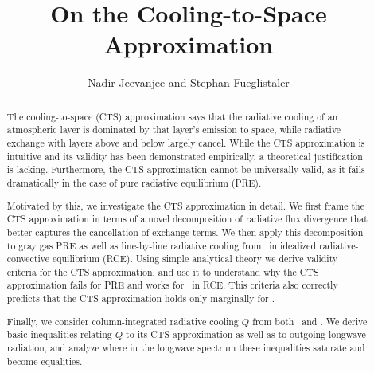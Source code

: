\documentclass[10pt]{article}
\begin{document}
%
%


\title{On the Cooling-to-Space Approximation}

%
%


 \author{Nadir Jeevanjee and Stephan Fueglistaler}

\maketitle

\begin{abstract}
The cooling-to-space (CTS) approximation says that the radiative cooling of an atmospheric layer is dominated by that layer's emission to space, while radiative exchange with layers above and below largely cancel. While the CTS approximation is intuitive and its validity  has been demonstrated empirically, a theoretical justification is lacking. Furthermore, the CTS approximation cannot be universally valid, as it fails dramatically in the case of pure radiative equilibrium (PRE).

Motivated by this, we investigate the CTS approximation in detail. We first frame the CTS approximation in terms of  a novel decomposition of radiative flux divergence that better captures the cancellation of exchange terms. We then apply this decomposition to gray gas PRE  as well as line-by-line radiative cooling from \htwo\ in idealized radiative-convective equilibrium (RCE).  Using simple analytical theory we derive validity criteria for the CTS approximation, and use it to understand why the CTS approximation fails for PRE and works for \htwo\ in RCE. This criteria also correctly predicts that the CTS approximation holds only marginally for \cotwo.

Finally, we consider column-integrated radiative cooling $Q$ from both \htwo\ and \cotwo. We derive basic inequalities relating $Q$ to its CTS approximation as well as to outgoing longwave radiation, and analyze where in the longwave spectrum these inequalities  saturate and become equalities.


%
%
\end{abstract}
\end{document}
